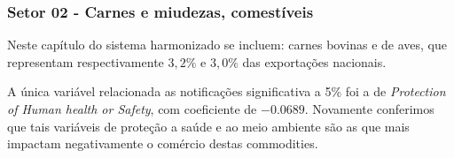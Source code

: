 % 
% 
%  
% 
% 

\subsubsection{Setor 02 - Carnes e miudezas, comestíveis}


 

Neste capítulo do sistema harmonizado se incluem: carnes bovinas e de aves, que representam respectivamente $3,2\%$ e $3,0\%$ das exportações nacionais.

A única variável relacionada as notificações significativa a 5\% foi a de \emph{Protection of Human health or Safety}, com coeficiente de $-0.0689$. Novamente conferimos que tais variáveis de proteção a saúde e ao meio ambiente são as que mais impactam negativamente o comércio destas commodities.


